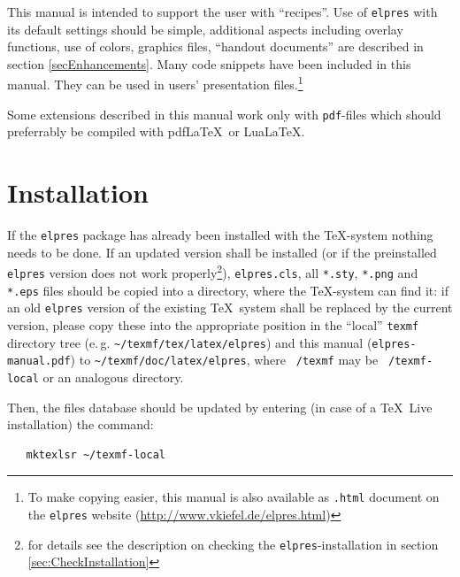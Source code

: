 \documentclass[11pt,a4paper]{article}
\begin{document}
This manual is intended to support the user with ``recipes''.  Use of
\texttt{elpres} with its default settings should be simple, additional aspects
including overlay functions, use of colors, graphics files, ``handout
documents'' are described in section \ref{secEnhancements}. Many code snippets
have been included in this manual.
They can be used in users' presentation files.\footnote{To make copying easier,
this manual is also available as \texttt{.html} document on the
\texttt{elpres} website (\url{http://www.vkiefel.de/elpres.html})}

Some extensions described in this manual work only with \texttt{pdf}-files
which should preferrably be compiled with pdf\LaTeX\ or Lua\LaTeX.

\section{Installation}

\label{sec:installation}


\begin{sloppypar}

  If the \texttt{elpres} package has already been
  installed with the \TeX-system nothing needs to be done.  If an updated
  version shall be installed (or if the preinstalled \texttt{elpres} version
  does not work properly\footnote{for details see the description on checking the
    \texttt{elpres}-installation in section
    \ref{sec:CheckInstallation}}),
  \texttt{elpres.cls}, all \texttt{*.sty},
  \texttt{*.png} and \texttt{*.eps} files should be copied into a directory,
  where the \TeX-system can find it: if an old \texttt{elpres} version of the
  existing \TeX\ system shall be replaced by the current version, please copy
  these into the appropriate position in the ``local'' \texttt{texmf}
  directory tree (e.\,g. \verb+~/texmf/tex/latex/elpres+) and this manual
  (\texttt{elpres-manual.pdf}) to \verb+~/texmf/doc/latex/elpres+, where
  \texttt{~/texmf} may be \texttt{~/texmf-local} or an
  analogous directory.

Then, the files database should be updated by entering (in case of a \TeX~Live
installation) the command:

\end{sloppypar}

\begin{verbatim}
   mktexlsr ~/texmf-local
\end{verbatim}
\end{document}
